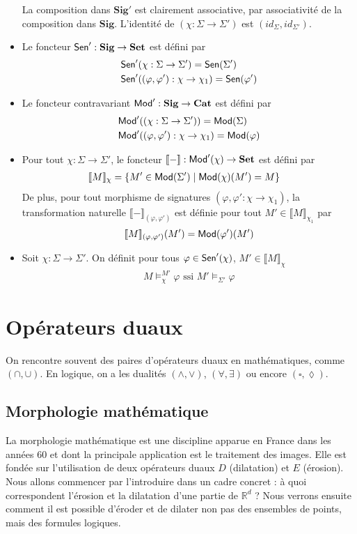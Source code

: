 \documentclass[11pt,a4paper]{article}
\newcommand{\ph}{\varphi}
\newcommand{\itemz}{\item[$\triangleright$]}
\newcommand{\gr}{\textbf}
\newcommand{\lb}{\llbracket}
\newcommand{\rb}{\rrbracket}
\newcommand{\info}[1]{\text{{\fontfamily{lmss}\selectfont #1}}}
\newcommand{\Mod}{\info{Mod}}
\newcommand{\Sen}{\info{Sen}}
\newcommand{\1}{\mathbbm{1}}
\begin{document}
\begin{itemize}
La composition dans $\gr{Sig}'$ est clairement associative, par associativité de la composition dans $\gr{Sig}$. L'identité de $(\chi : \Sigma \to \Sigma')$ est $(id_\Sigma,id_{\Sigma'})$.
\itemz Le foncteur $\Sen' : \gr{Sig} \to \gr{Set}$ est défini par
\begin{align*}
&\Sen'(\chi : \Sigma \to \Sigma') = \Sen(\Sigma') \\
&\Sen'((\ph,\ph') : \chi \to \chi_1) = \Sen(\ph') 
\end{align*}
\itemz Le foncteur contravariant $\Mod' : \gr{Sig} \to \gr{Cat}$ est défini par 
\begin{align*} 
& \Mod'((\chi : \Sigma \to \Sigma')) = \Mod(\Sigma) \\
& \Mod'((\ph,\ph') : \chi \to \chi_1) = \Mod(\ph)
\end{align*}
\itemz Pour tout $\chi : \Sigma \to \Sigma'$, le foncteur $\lb - \rb : \Mod'(\chi) \to \gr{Set}$ est défini par
\begin{align*}
& \lb M \rb_\chi = \{ M' \in \Mod(\Sigma') \mid \Mod(\chi)(M') = M \}
\end{align*}
De plus, pour tout morphisme de signatures $(\ph,\ph' : \chi \to \chi_1)$, la transformation naturelle $\lb - \rb_{(\ph,\ph')}$ est définie pour tout $M' \in \lb M \rb_{\chi_1}$ par
\[ \lb M \rb_{(\ph,\ph')}(M') = \Mod(\ph')(M') \]
\itemz Soit $\chi : \Sigma \to \Sigma'$. On définit pour tous $\ph \in \Sen'(\chi)$, $M' \in \lb M \rb_\chi$
\begin{align*}
M \models_\chi^{M'} \ph \text{ ssi } M' \models_{\Sigma'} \ph
\end{align*}
\end{itemize}
\newpage
\section{Opérateurs duaux}
On rencontre souvent des paires d'opérateurs duaux en mathématiques, comme $(\cap,\cup)$. En logique, on a les dualités $(\wedge,\vee)$, $(\forall,\exists)$ ou encore $(\square,\lozenge)$.
\subsection{Morphologie mathématique}
La morphologie mathématique est une discipline apparue en France dans les années 60 et dont la principale application est le traitement des images. Elle est fondée sur l'utilisation de deux opérateurs duaux $D$ (dilatation) et $E$ (érosion). Nous allons commencer par l'introduire dans un cadre concret : à quoi correspondent l'érosion et la dilatation d'une partie de $\mathbb{R}^d$ ? Nous verrons ensuite comment il est possible d'éroder et de dilater non pas des ensembles de points, mais des formules logiques.
\newpage
\end{document}
